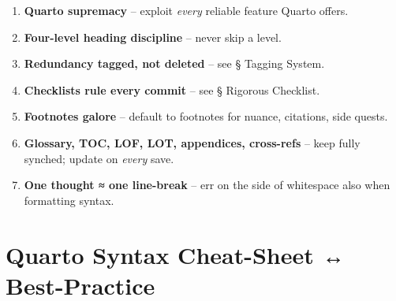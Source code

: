 \documentclass[
  11pt,
  letterpaper,
]{book}
\providecommand{\tightlist}{%
  \setlength{\itemsep}{0pt}\setlength{\parskip}{0pt}}
\begin{document}
\begin{enumerate}
\def\labelenumi{\arabic{enumi}.}
\tightlist
\item
  \textbf{Quarto supremacy} -- exploit \emph{every} reliable feature
  Quarto offers.\\
\item
  \textbf{Four-level heading discipline} -- never skip a level.\\
\item
  \textbf{Redundancy tagged, not deleted} -- see § Tagging System.\\
\item
  \textbf{Checklists rule every commit} -- see § Rigorous Checklist.\\
\item
  \textbf{Footnotes galore} -- default to footnotes for nuance,
  citations, side quests.\\
\item
  \textbf{Glossary, TOC, LOF, LOT, appendices, cross-refs} -- keep fully
  synched; update on \emph{every} save.\\
\item
  \textbf{One thought ≈ one line-break} -- err on the side of whitespace
  also when formatting syntax.
\end{enumerate}

\section*{Quarto Syntax Cheat-Sheet ↔
Best-Practice}\label{quarto-syntax-cheat-sheet-best-practice}

\end{document}
